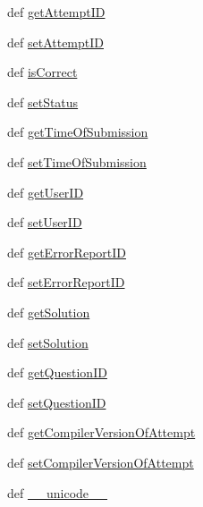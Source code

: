 \begin{DoxyCompactItemize}
\item 
def \hyperlink{class_ecodena_1_1_attempt_1_1models_1_1_attempt_a09621434733185bbfaad03baeb542e8c}{getAttemptID}
\item 
def \hyperlink{class_ecodena_1_1_attempt_1_1models_1_1_attempt_ae37cf365bc17bd05860bffedfc6e8024}{setAttemptID}
\item 
def \hyperlink{class_ecodena_1_1_attempt_1_1models_1_1_attempt_a2288edd3e2db6b9f0eba1f13724ab2cb}{isCorrect}
\item 
def \hyperlink{class_ecodena_1_1_attempt_1_1models_1_1_attempt_a0216fa674160d728cbecad4cc61460bd}{setStatus}
\item 
def \hyperlink{class_ecodena_1_1_attempt_1_1models_1_1_attempt_a9ec58d1721623601cbbb0317cc2e5bd7}{getTimeOfSubmission}
\item 
def \hyperlink{class_ecodena_1_1_attempt_1_1models_1_1_attempt_acb5e68040b88170abadacbe5c5a07700}{setTimeOfSubmission}
\item 
def \hyperlink{class_ecodena_1_1_attempt_1_1models_1_1_attempt_a3c152422e0560c116aed26f6f8054e94}{getUserID}
\item 
def \hyperlink{class_ecodena_1_1_attempt_1_1models_1_1_attempt_a9094fdb34b59ebee5a1196401654a82c}{setUserID}
\item 
def \hyperlink{class_ecodena_1_1_attempt_1_1models_1_1_attempt_a3b4fec981da7e11a993d9f7ad6731a97}{getErrorReportID}
\item 
def \hyperlink{class_ecodena_1_1_attempt_1_1models_1_1_attempt_a337d130f509d1f0d192446320cd26e0a}{setErrorReportID}
\item 
def \hyperlink{class_ecodena_1_1_attempt_1_1models_1_1_attempt_a0012bb51837a6fa0ba28391043815435}{getSolution}
\item 
def \hyperlink{class_ecodena_1_1_attempt_1_1models_1_1_attempt_a6fe57d3945acf48901ba712d4709d452}{setSolution}
\item 
def \hyperlink{class_ecodena_1_1_attempt_1_1models_1_1_attempt_a10be25c031836b71f3caa472b15926db}{getQuestionID}
\item 
def \hyperlink{class_ecodena_1_1_attempt_1_1models_1_1_attempt_a98aea32dc0b17c09080c9ce3055ae2ef}{setQuestionID}
\item 
def \hyperlink{class_ecodena_1_1_attempt_1_1models_1_1_attempt_a0810b24b24c643902a28c764a9376082}{getCompilerVersionOfAttempt}
\item 
def \hyperlink{class_ecodena_1_1_attempt_1_1models_1_1_attempt_ad956d292a49b13e541b808e1309d4f22}{setCompilerVersionOfAttempt}
\item 
def \hyperlink{class_ecodena_1_1_attempt_1_1models_1_1_attempt_a1465d1b46a90132d359af87dde819e95}{\_\-\_\-unicode\_\-\_\-}
\end{DoxyCompactItemize}
